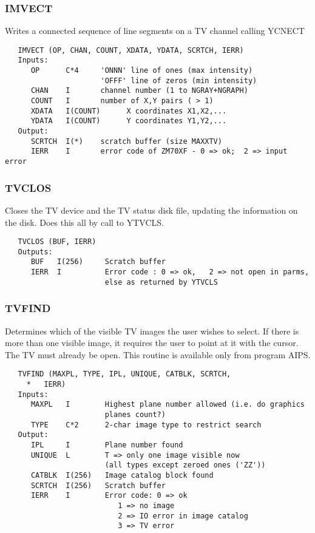 \subsubsection{IMVECT}
Writes a connected sequence of line segments on a TV channel
calling YCNECT
\begin{verbatim}
   IMVECT (OP, CHAN, COUNT, XDATA, YDATA, SCRTCH, IERR)
   Inputs:
      OP      C*4     'ONNN' line of ones (max intensity)
                      'OFFF' line of zeros (min intensity)
      CHAN    I       channel number (1 to NGRAY+NGRAPH)
      COUNT   I       number of X,Y pairs ( > 1)
      XDATA   I(COUNT)      X coordinates X1,X2,...
      YDATA   I(COUNT)      Y coordinates Y1,Y2,...
   Output:
      SCRTCH  I(*)    scratch buffer (size MAXXTV)
      IERR    I       error code of ZM70XF - 0 => ok;  2 => input error
\end{verbatim}

\subsubsection{TVCLOS}
Closes the TV device and the TV status disk file, updating
the information on the disk.  Does this all by call to YTVCLS.
\begin{verbatim}
   TVCLOS (BUF, IERR)
   Outputs:
      BUF   I(256)     Scratch buffer
      IERR  I          Error code : 0 => ok,   2 => not open in parms,
                       else as returned by YTVCLS
\end{verbatim}

\subsubsection{TVFIND}
Determines which of the visible TV images the user wishes to
select.  If there is more than one visible image, it requires the
user to point at it with the cursor.  The TV must already be open.
This routine is available only from program AIPS.
\begin{verbatim}
   TVFIND (MAXPL, TYPE, IPL, UNIQUE, CATBLK, SCRTCH,
     *   IERR)
   Inputs:
      MAXPL   I        Highest plane number allowed (i.e. do graphics
                       planes count?)
      TYPE    C*2      2-char image type to restrict search
   Output:
      IPL     I        Plane number found
      UNIQUE  L        T => only one image visible now
                       (all types except zeroed ones ('ZZ'))
      CATBLK  I(256)   Image catalog block found
      SCRTCH  I(256)   Scratch buffer
      IERR    I        Error code: 0 => ok
                          1 => no image
                          2 => IO error in image catalog
                          3 => TV error
\end{verbatim}

